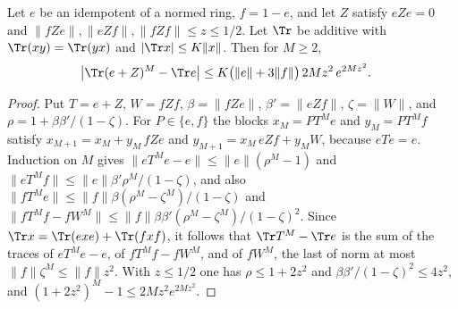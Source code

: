 \begin{lemma}
    \label{thm:ldp_idempotent_second_order}
    \leanok
    Let $e$ be an idempotent of a normed ring, $f=1-e$, and let $Z$ satisfy
    $eZe=0$ and $\lVert fZe\rVert,\lVert eZf\rVert,\lVert fZf\rVert\le z\le1/2$.
    Let $\Tr$ be additive with $\Tr(xy)=\Tr(yx)$ and
    $\lvert\Tr x\rvert\le K\lVert x\rVert$. Then for $M\ge2$,
    \begin{align}
        \bigl\lvert\Tr(e+Z)^M-\Tr e\bigr\rvert
         & \le K\bigl(\lVert e\rVert+3\lVert f\rVert\bigr)\,2Mz^2\,e^{2Mz^2}.
        \notag
    \end{align}
\end{lemma}
\begin{proof}
    \leanok
    Put $T=e+Z$, $W=fZf$, $\beta=\lVert fZe\rVert$, $\beta'=\lVert eZf\rVert$,
    $\zeta=\lVert W\rVert$, and $\rho=1+\beta\beta'/(1-\zeta)$. For $P\in\{e,f\}$
    the blocks $x_M=PT^Me$ and $y_M=PT^Mf$ satisfy
    $x_{M+1}=x_M+y_M\,fZe$ and $y_{M+1}=x_M\,eZf+y_MW$, because $eTe=e$.
    Induction on $M$ gives $\lVert eT^Me-e\rVert\le\lVert e\rVert(\rho^M-1)$ and
    $\lVert eT^Mf\rVert\le\lVert e\rVert\beta'\rho^M/(1-\zeta)$, and also
    $\lVert fT^Me\rVert\le\lVert f\rVert\beta(\rho^M-\zeta^M)/(1-\zeta)$ and
    $\lVert fT^Mf-fW^M\rVert\le\lVert f\rVert\beta\beta'(\rho^M-\zeta^M)/(1-\zeta)^2$.
    Since $\Tr x=\Tr(exe)+\Tr(fxf)$, it follows that $\Tr T^M-\Tr e$ is the sum of
    the traces of $eT^Me-e$, of $fT^Mf-fW^M$, and of $fW^M$, the last of norm at
    most $\lVert f\rVert\zeta^M\le\lVert f\rVert z^2$. With $z\le1/2$ one has
    $\rho\le1+2z^2$ and $\beta\beta'/(1-\zeta)^2\le4z^2$, and
    $(1+2z^2)^M-1\le2Mz^2e^{2Mz^2}$.
\end{proof}

